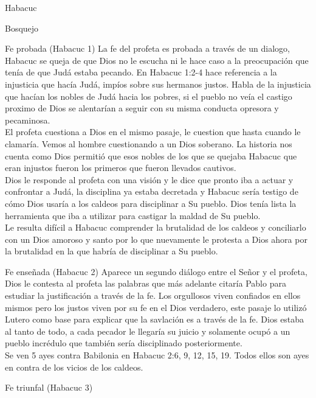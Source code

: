 \begin{section}{Habacuc}
\begin{enumerate}
	\end{enumerate}
	\begin{subsection}{Bosquejo}
		\begin{subsubsection}{Fe probada (Habacuc 1)}
			La fe del profeta es probada a través de un dialogo, Habacuc se queja de que Dios no le escucha ni le hace caso a la preocupación que tenía de que Judá estaba pecando. En Habacuc 1:2-4 hace referencia a la injusticia que hacía Judá, impíos sobre sus hermanos justos.
			\newpage
			Habla de la injusticia que hacían los nobles de Judá hacia los pobres, si el pueblo no veía el castigo proximo de Dios se alentarían a seguir con su misma conducta opresora y pecaminosa.\\
			El profeta cuestiona a Dios en el mismo pasaje, le cuestion que hasta cuando le clamaría. Vemos al hombre cuestionando a un Dios soberano. La historia nos cuenta como Dios permitió que esos nobles de los que se quejaba Habacuc que eran injustos fueron los primeros que fueron llevados cautivos.\\
			Dios le responde al profeta con una visión y le dice que pronto iba a actuar y confrontar a Judá, la disciplina ya estaba decretada y Habacuc sería testigo de cómo Dios usaría a los caldeos para disciplinar a Su pueblo. Dios tenía lista la herramienta que iba a utilizar para castigar la maldad de Su pueblo.\\
			Le resulta difícil a Habacuc comprender la brutalidad de los caldeos y conciliarlo con un Dios amoroso y santo por lo que nuevamente le protesta a Dios ahora por la brutalidad en la que habría de disciplinar a Su pueblo. 
		\end{subsubsection}
		\begin{subsubsection}{Fe enseñada (Habacuc 2)}
			Aparece un segundo diálogo entre el Señor y el profeta, Dios le contesta al profeta las palabras que más adelante citaría Pablo para estudiar la justificación a través de la fe. Los orgullosos viven confiados en ellos mismos pero los justos viven por su fe en el Dios verdadero, este pasaje lo utilizó Lutero como base para explicar que la savlación es a través de la fe. Dios estaba al tanto de todo, a cada pecador le llegaría su juicio y solamente ocupó a un pueblo incrédulo que también sería disciplinado posteriormente.\\
			Se ven 5 ayes contra Babilonia en Habacuc 2:6, 9, 12, 15, 19. Todos ellos son ayes en contra de los vicios de los caldeos.
		\end{subsubsection}
		\begin{subsubsection}{Fe triunfal (Habacuc 3)}

\end{subsubsection}
\end{subsection}
\end{section}
